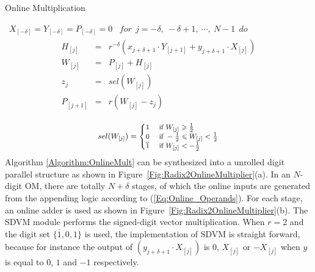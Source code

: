 \documentclass{acm_proc_article-sp}
\begin{document}
\begin{algorithm}[tbp]
  \caption{Online Multiplication}
  \begin{algorithmic}[1]
    \REQUIRE~$X_{[-\delta]}=Y_{[-\delta]}=P_{[-\delta]}=0$
    \ENSURE~$for~~ j=-\delta,~-\delta+1,~\cdots,~N-1 ~~do$
      \begin{eqnarray}\label{Eq:OnlineMult_General}
        \begin{matrix}
          H_{[j]}   & = & r^{-\delta}\left(x_{j+\delta+1}\cdot Y_{[j+1]}+y_{j+\delta+1}\cdot X_{[j]}\right)\\
          W_{[j]}   & = & P_{[j]} + H_{[j]}\\
          z_j       & = & sel(W_{[j]})\\
          P_{[j+1]} & = & r\left(W_{[j]}-z_j\right)
        \end{matrix}
      \end{eqnarray}
  \label{Algorithm:OnlineMult}
  \vspace{-2ex}
  \end{algorithmic}
\end{algorithm}
\vspace{-2ex}

\vspace{-2ex}
\begin{eqnarray}\label{Eq:SelFunc_OM}
\small
  sel(W_{[j]})=\begin{cases}
    1 & \text{ if } W_{[j]} \geqslant \frac{1}{2} \\
    0 & \text{ if } -\frac{1}{2}\leqslant W_{[j]}<\frac{1}{2} \\
    \overline{1} & \text{ if } W_{[j]}<-\frac{1}{2}
  \end{cases}
\normalsize
\end{eqnarray}
%
Algorithm \ref{Algorithm:OnlineMult} can be synthesized into a unrolled digit parallel structure as shown in  Figure~\ref{Fig:Radix2OnlineMultiplier}(a). In an $N$-digit OM, there are totally $N+\delta$ stages, of which the online inputs are generated from the appending logic according to (\ref{Eq:Online_Operands}). For each stage, an online adder is used as shown in Figure~\ref{Fig:Radix2OnlineMultiplier}(b). The SDVM module performs the signed-digit vector multiplication. When $r=2$ and the digit set $\{\overline{1},0,1\}$ is used, the implementation of SDVM is straight forward, because for instance the output of $(y_{j+\delta+1}\cdot X_{[j]})$ is 0, $X_{[j]}$ or $-X_{[j]}$ when $y$ is equal to $0$, $1$ and $-1$ respectively.\vspace{-1ex}
\end{document}

